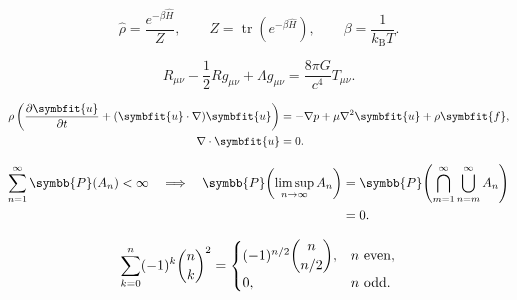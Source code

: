 \documentclass[a4paper,10pt]{article}
\begin{document}
\[
\hat\rho=\frac{e^{-\beta\hat H}}{Z},\qquad
Z=\operatorname{tr}\!\left(e^{-\beta\hat H}\right),\qquad
\beta=\frac{1}{k_{\mathrm B}T}.
\]

\[
R_{\mu\nu}-\frac12 Rg_{\mu\nu}+\Lambda g_{\mu\nu}
 =\frac{8\pi G}{c^4}T_{\mu\nu}.
\]

\[
\begin{aligned}
\rho\left(\frac{\partial\symbfit{u}}{\partial t}
 +(\symbfit{u}\cdot\nabla)\symbfit{u}\right)
 &=-\nabla p+\mu\nabla^2\symbfit{u}+\rho\symbfit{f},\\
\nabla\cdot\symbfit{u}&=0.
\end{aligned}
\]

\begin{equation*}
\begin{aligned}
\sum_{n=1}^{\infty}\symbb{P}(A_n)<\infty
\quad\Longrightarrow\quad
\symbb{P}\!\left(\limsup_{n\to\infty}A_n\right)
&=\symbb{P}\!\left(
 \bigcap_{m=1}^{\infty}\bigcup_{n=m}^{\infty}A_n
 \right)\\
&=0.
\end{aligned}
\end{equation*}

\begin{equation*}
\sum_{k=0}^{n}(-1)^k\binom{n}{k}^{2}
=\begin{cases}
 (-1)^{n/2}\dbinom{n}{n/2},&n\text{ even},\\[5pt]
 0,&n\text{ odd}.
\end{cases}
\end{equation*}
\end{document}
